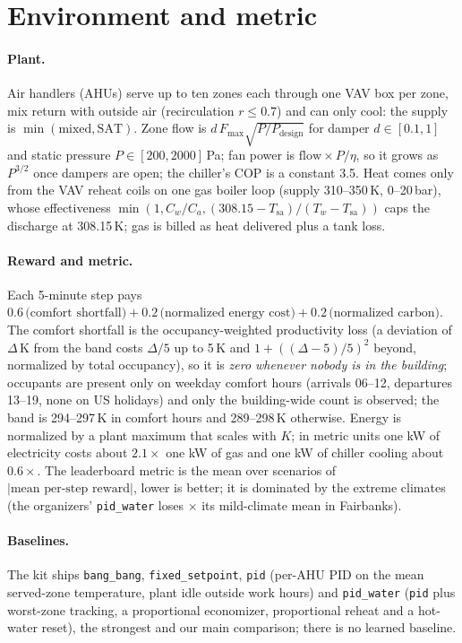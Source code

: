\documentclass{article}
\begin{document}
\section{Environment and metric}
\label{sec:env}

\paragraph{Plant.}
Air handlers (AHUs) serve up to ten zones each through one VAV box per zone, mix return with
outside air (recirculation $r\le 0.7$) and can only cool: the supply is $\min(\text{mixed},
\text{SAT})$. Zone flow is $d\,F_{\max}\sqrt{P/P_{\text{design}}}$ for damper $d\in[0.1,1]$ and static
pressure $P\in[200,2000]$\,Pa; fan power is $\text{flow}\times P/\eta$, so it grows as $P^{3/2}$ once
dampers are open; the chiller's COP is a constant 3.5. Heat comes only from the VAV reheat coils on one
gas boiler loop (supply 310--350\,K, 0--20\,bar), whose effectiveness $\min(1, C_w/C_a,
(308.15-T_{\text{sa}})/(T_w - T_{\text{sa}}))$ caps the discharge at 308.15\,K; gas is billed as heat
delivered plus a tank loss.

\paragraph{Reward and metric.}
Each 5-minute step pays $0.6\,\text{(comfort shortfall)} + 0.2\,\text{(normalized energy
cost)} + 0.2\,\text{(normalized carbon)}$. The comfort shortfall is the occupancy-weighted
productivity loss (a deviation of $\Delta$\,K from the band costs $\Delta/5$ up to 5\,K and
$1+((\Delta-5)/5)^2$ beyond, normalized by total occupancy), so it is \emph{zero whenever
nobody is in the building}; occupants are present only on weekday comfort hours (arrivals
06--12, departures 13--19, none on US holidays) and only the building-wide count is
observed; the band is 294--297\,K in comfort hours and 289--298\,K otherwise. Energy is
normalized by a plant maximum that scales with $K$; in metric units one kW of electricity
costs about $2.1\times$ one kW of gas and one kW of chiller cooling about $0.6\times$. The
leaderboard metric is the mean over scenarios of
$|\text{mean per-step reward}|$, lower is better; it is dominated by the extreme climates
(the organizers' \texttt{pid\_water} loses \ExtremeRatioFairbanks$\times$ its mild-climate
mean in Fairbanks).

\paragraph{Baselines.}
The kit ships \texttt{bang\_bang}, \texttt{fixed\_setpoint}, \texttt{pid} (per-AHU PID on the
mean served-zone temperature, plant idle outside work hours) and \texttt{pid\_water}
(\texttt{pid} plus worst-zone tracking, a proportional economizer, proportional reheat and a
hot-water reset), the strongest and our main comparison; there is no learned baseline.
\end{document}
